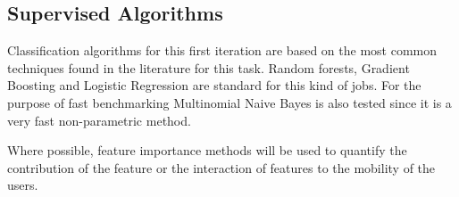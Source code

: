 
\subsection{Supervised Algorithms}

Classification algorithms for this first iteration are based on the most common techniques found in the literature for this task. Random forests, Gradient Boosting and Logistic Regression are standard for this kind of jobs. For the purpose of fast benchmarking Multinomial Naive Bayes is also tested since it is a very fast non-parametric method. 

Where possible, feature importance methods will be used to quantify the contribution of the feature or the interaction of features to the mobility of the users.

